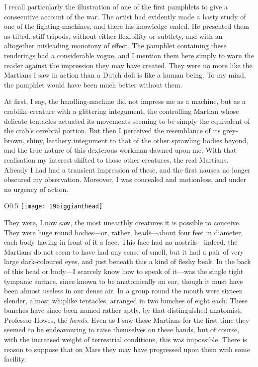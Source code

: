 I recall particularly the illustration of one of the first pamphlets to give a consecutive account of the war. The artist had evidently made a hasty study of one of the fighting-machines, and there his knowledge ended. He presented them as tilted, stiff tripods, without either flexibility or subtlety, and with an altogether misleading monotony of effect. The pamphlet containing these renderings had a considerable vogue, and I mention them here simply to warn the reader against the impression they may have created. They were no more like the Martians I saw in action than a Dutch doll is like a human being. To my mind, the pamphlet would have been much better without them.

At first, I say, the handling-machine did not impress me as a machine, but as a crablike creature with a glittering integument, the controlling Martian whose delicate tentacles actuated its movements seeming to be simply the equivalent of the crab's cerebral portion. But then I perceived the resemblance of its grey-brown, shiny, leathery integument to that of the other sprawling bodies beyond, and the true nature of this dexterous workman dawned upon me. With that realisation my interest shifted to those other creatures, the real Martians. Already I had had a transient impression of these, and the first nausea no longer obscured my observation. Moreover, I was concealed and motionless, and under no urgency of action.


\begin{wrapfigure}{O}{0.5\textwidth}
\centering
\texttt{[image: 19biggianthead]}
\end{wrapfigure}

They were, I now saw, the most unearthly creatures it is possible to conceive. They were huge round bodies—or, rather, heads—about four feet in diameter, each body having in front of it a face. This face had no nostrils—indeed, the Martians do not seem to have had any sense of smell, but it had a pair of very large dark-coloured eyes, and just beneath this a kind of fleshy beak. In the back of this head or body—I scarcely know how to speak of it—was the single tight tympanic surface, since known to be anatomically an ear, though it must have been almost useless in our dense air. In a group round the mouth were sixteen slender, almost whiplike tentacles, arranged in two bunches of eight each. These bunches have since been named rather aptly, by that distinguished anatomist, Professor Howes, the \textit{hands}. Even as I saw these Martians for the first time they seemed to be endeavouring to raise themselves on these hands, but of course, with the increased weight of terrestrial conditions, this was impossible. There is reason to suppose that on Mars they may have progressed upon them with some facility.

